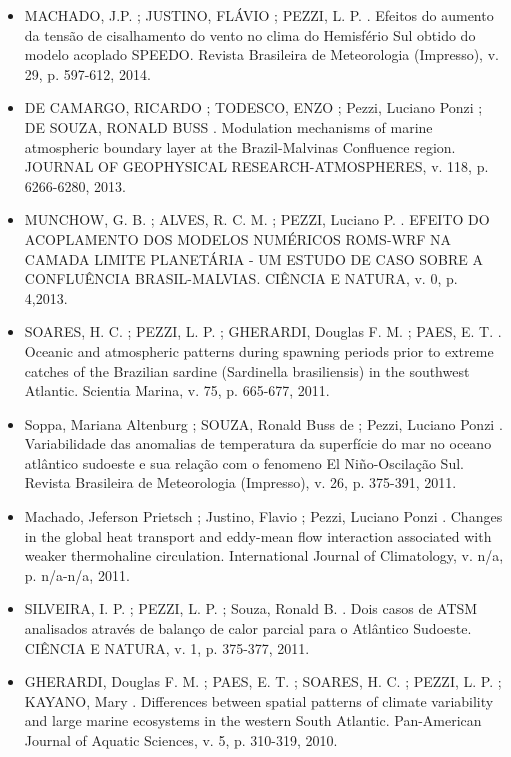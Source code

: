\documentclass[11pt, a4paper]{awesome-cv}
\begin{document}
\begin{cvletter}
\begin{itemize}
  \item[] MACHADO, J.P. ; JUSTINO, FLÁVIO ; PEZZI, L. P. . Efeitos do aumento da tensão de cisalhamento 
  do vento no clima do Hemisfério Sul obtido do modelo acoplado SPEEDO. Revista Brasileira de 
  Meteorologia (Impresso), v. 29, p. 597-612,
  2014.

  \item[] DE CAMARGO, RICARDO ; TODESCO, ENZO ; Pezzi, Luciano Ponzi ; DE SOUZA, RONALD BUSS . 
  Modulation mechanisms of marine atmospheric boundary layer at the Brazil-Malvinas Confluence region. 
  JOURNAL OF GEOPHYSICAL RESEARCH-ATMOSPHERES, v. 118, p. 6266-6280, 2013.

  \item[] MUNCHOW, G. B. ; ALVES, R. C. M. ; PEZZI, Luciano P. . EFEITO DO ACOPLAMENTO DOS MODELOS 
  NUMÉRICOS ROMS-WRF NA CAMADA LIMITE PLANETÁRIA - UM ESTUDO DE CASO SOBRE A CONFLUÊNCIA 
  BRASIL-MALVIAS. CIÊNCIA E NATURA, v. 0, p. 4,2013.

  \item[] SOARES, H. C. ; PEZZI, L. P. ; GHERARDI, Douglas F. M. ; PAES, E. T. . Oceanic and 
  atmospheric patterns during spawning periods prior to extreme catches of the Brazilian sardine 
  (Sardinella brasiliensis) in the southwest Atlantic. Scientia Marina, v. 75, p. 665-677,
  2011.

  \item[] Soppa, Mariana Altenburg ; SOUZA, Ronald Buss de ; Pezzi, Luciano Ponzi . Variabilidade das 
  anomalias de temperatura da superfície do mar no oceano atlântico sudoeste e sua relação com o 
  fenomeno El Niño-Oscilação Sul. Revista Brasileira de Meteorologia (Impresso), v. 26, p. 375-391, 
  2011.

  \item[] Machado, Jeferson Prietsch ; Justino, Flavio ; Pezzi, Luciano Ponzi . Changes in the global 
  heat transport and eddy-mean flow interaction associated with weaker thermohaline circulation. 
  International Journal of Climatology, v. n/a, p. n/a-n/a, 2011.

  \item[] SILVEIRA, I. P. ; PEZZI, L. P. ; Souza, Ronald B. . Dois casos de ATSM analisados através de
  balanço de calor parcial para o Atlântico Sudoeste. CIÊNCIA E NATURA, v. 1, p. 375-377,
  2011.

  \item[] 
  GHERARDI, Douglas F. M. ; PAES, E. T. ; SOARES, H. C. ; PEZZI, L. P. ; KAYANO, Mary . 
  Differences between spatial patterns of climate variability and large marine ecosystems in 
  the western South Atlantic. Pan-American Journal of Aquatic Sciences, v. 5, p. 310-319, 2010.


\end{itemize}
\end{cvletter}
\end{document}

